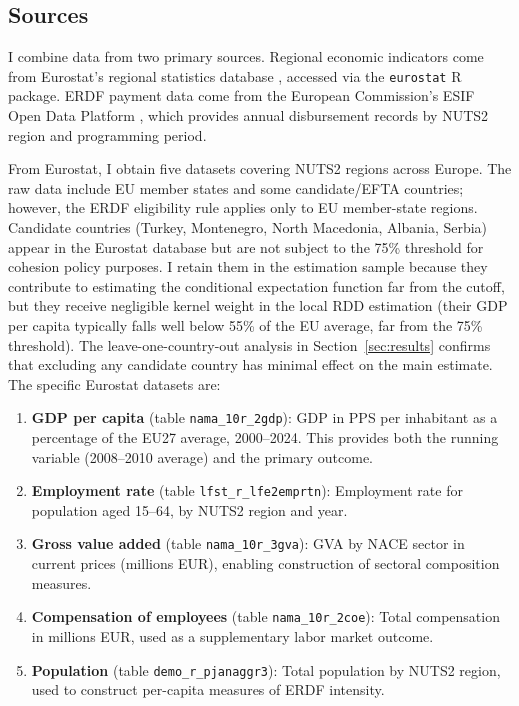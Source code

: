 \documentclass[12pt]{article}
\begin{document}
\subsection{Sources}

I combine data from two primary sources. Regional economic indicators come from Eurostat's regional statistics database \citep{Eurostat2024}, accessed via the \texttt{eurostat} R package. ERDF payment data come from the European Commission's ESIF Open Data Platform \citep{CohesionData2024}, which provides annual disbursement records by NUTS2 region and programming period.

From Eurostat, I obtain five datasets covering NUTS2 regions across Europe. The raw data include EU member states and some candidate/EFTA countries; however, the ERDF eligibility rule applies only to EU member-state regions. Candidate countries (Turkey, Montenegro, North Macedonia, Albania, Serbia) appear in the Eurostat database but are not subject to the 75\% threshold for cohesion policy purposes. I retain them in the estimation sample because they contribute to estimating the conditional expectation function far from the cutoff, but they receive negligible kernel weight in the local RDD estimation (their GDP per capita typically falls well below 55\% of the EU average, far from the 75\% threshold). The leave-one-country-out analysis in Section~\ref{sec:results} confirms that excluding any candidate country has minimal effect on the main estimate. The specific Eurostat datasets are:
\begin{enumerate}
    \item \textbf{GDP per capita} (table \texttt{nama\_10r\_2gdp}): GDP in PPS per inhabitant as a percentage of the EU27 average, 2000--2024. This provides both the running variable (2008--2010 average) and the primary outcome.
    \item \textbf{Employment rate} (table \texttt{lfst\_r\_lfe2emprtn}): Employment rate for population aged 15--64, by NUTS2 region and year.
    \item \textbf{Gross value added} (table \texttt{nama\_10r\_3gva}): GVA by NACE sector in current prices (millions EUR), enabling construction of sectoral composition measures.
    \item \textbf{Compensation of employees} (table \texttt{nama\_10r\_2coe}): Total compensation in millions EUR, used as a supplementary labor market outcome.
    \item \textbf{Population} (table \texttt{demo\_r\_pjanaggr3}): Total population by NUTS2 region, used to construct per-capita measures of ERDF intensity.
\end{enumerate}
\end{document}
